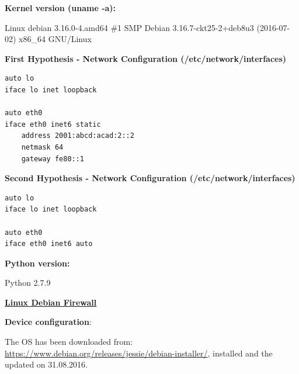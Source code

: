 \documentclass[12pt]{article}
\begin{document}
\textbf{Kernel version (uname -a):} 

\vspace{-15pt}
Linux debian 3.16.0-4.amd64 \#1 SMP Debian 3.16.7-ckt25-2+deb8u3 (2016-07-02) x86_64 GNU/Linux

\textbf{First Hypothesis - Network Configuration (/etc/network/interfaces)}
\vspace{-5pt}
\begin{lstlisting}[style=python,basicstyle=\ttfamily\scriptsize]
auto lo
iface lo inet loopback

auto eth0
iface eth0 inet6 static
	address 2001:abcd:acad:2::2
	netmask 64
	gateway fe80::1
\end{lstlisting}

\vspace{-10pt}
\textbf{Second Hypothesis - Network Configuration (/etc/network/interfaces)}
\vspace{-5pt}
\begin{lstlisting}[style=python,basicstyle=\ttfamily\scriptsize]
auto lo
iface lo inet loopback

auto eth0
iface eth0 inet6 auto
\end{lstlisting}

\textbf{Python version:} 

\vspace{-15pt}
Python 2.7.9

\textbf{\underline{Linux Debian Firewall}}

\vspace{-10pt}
\textbf{Device configuration}:

\begin{savenotes}
\begin{table}[!htpb]
\centering
\addtolength{\tabcolsep}{1pt}
\noindent{}
\caption{Linux Debian Firewall}
\label{table:linuxDebFirewall}
\end{table}
\end{savenotes}

The OS has been downloaded from: \url{https://www.debian.org/releases/jessie/debian-installer/}, installed and the updated on 31.08.2016.
\end{document}
